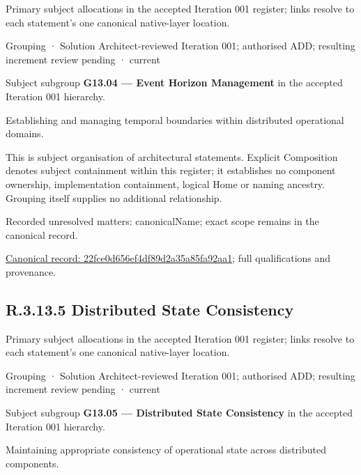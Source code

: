 Primary subject allocations in the accepted Iteration 001 register; links resolve to each statement’s one canonical native-layer location.\par
\label{element:22fce0d656ef4df89d2a35a85fa92aa1}
{\small Grouping · Solution Architect-reviewed Iteration 001; authorised ADD; resulting increment review pending · current}\par

Subject subgroup \textbf{G13.04 — Event Horizon Management} in the accepted Iteration 001 hierarchy.



Establishing and managing temporal boundaries within distributed operational domains.



This is subject organisation of architectural statements. Explicit Composition denotes subject containment within this register; it establishes no component ownership, implementation containment, logical Home or naming ancestry. Grouping itself supplies no additional relationship.


{\small Recorded unresolved matters: canonicalName; exact scope remains in the canonical record.}\par
{\footnotesize \href{../../../../continuum/grouping/22fce0d656ef4df89d2a35a85fa92aa1.md}{Canonical record: 22fce0d656ef4df89d2a35a85fa92aa1}; full qualifications and provenance.}\par
\subsection*{R.3.13.5 Distributed State Consistency}
\label{navigation:R.3.13.5}

Primary subject allocations in the accepted Iteration 001 register; links resolve to each statement’s one canonical native-layer location.\par
\label{element:71b9830ce1a543548334647cbbaec7f1}
{\small Grouping · Solution Architect-reviewed Iteration 001; authorised ADD; resulting increment review pending · current}\par

Subject subgroup \textbf{G13.05 — Distributed State Consistency} in the accepted Iteration 001 hierarchy.



Maintaining appropriate consistency of operational state across distributed components.



